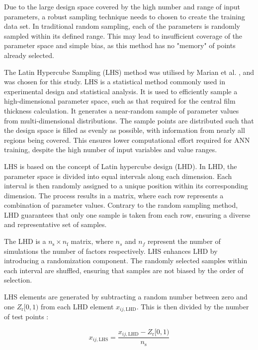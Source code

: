 Due to the large design space covered by the high number and range of input parameters, a robust sampling technique needs to chosen to create the training data set. In traditional random sampling, each of the parameters is randomly sampled within its defined range. This may lead to insufficient coverage of the parameter space and simple bias, as this method has no "memory" of points already selected.

The Latin Hypercube Sampling (LHS) method was utilised by Marian et al. \cite{Marian2022}, and was chosen for this study. LHS is a statistical method commonly used in experimental design and statistical analysis. It is used to efficiently sample a high-dimensional parameter space, such as that required for the central film thickness calculation. It generates a near-random sample of parameter values from multi-dimensional distributions. The sample points are distributed such that the design space is filled as evenly as possible, with information from nearly all regions being covered. This ensures lower computational effort required for ANN training, despite the high number of input variables and value ranges. 

LHS is based on the concept of Latin hypercube design (LHD). In LHD, the parameter space is divided into equal intervals along each dimension. Each interval is then randomly assigned to a unique position within its corresponding dimension. The process results in a matrix, where each row represents a combination of parameter values. Contrary to the random sampling method, LHD guarantees that only one sample is taken from each row, ensuring a diverse and representative set of samples.

The LHD is a $n_{\mathrm{s}} \times n_{\mathrm{f}}$ matrix, where $n_s$ and $n_f$ represent the number of simulations the number of factors respectively. LHS enhances LHD by introducing a randomization component. The randomly selected samples within each interval are shuffled, ensuring that samples are not biased by the order of selection.

LHS elements are generated by subtracting a random number between zero and one $Z_{\mathrm{r}}[0,1)$ from each LHD element $x_{i j, \mathrm{LHD}}$. This is then divided by the number of test points \cite{Siebertz2010}:

\begin{equation}\label{LHS}
	x_{i j, \mathrm{LHS}}=\frac{x_{i j, \mathrm{LHD}}-Z_{\mathrm{r}}[0,1)}{n_{\mathrm{s}}}
\end{equation}

